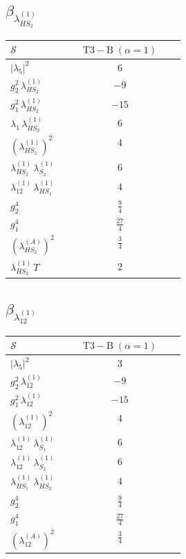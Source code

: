 \documentclass[9pt]{article}
\begin{document}
\subsection*{$ \beta_{\lambda_{HS_2}^{(1)}} $}
\begin{longtable}{@{}p{0.31\linewidth}c@{}}
\toprule
$\mathcal{S}$ & $ \mathrm{T3-B}\;(\alpha=1) $ \\
\midrule
$ |\lambda_5|^2 $ & $ 6 $ \\
$ g_2^2\,\lambda_{HS_2}^{(1)} $ & $ -9 $ \\
$ g_1^2\,\lambda_{HS_2}^{(1)} $ & $ -15 $ \\
$ \lambda_1\,\lambda_{HS_2}^{(1)} $ & $ 6 $ \\
$ \left(\lambda_{HS_2}^{(1)}\right)^2 $ & $ 4 $ \\
$ \lambda_{HS_2}^{(1)}\,\lambda_{S_2}^{(1)} $ & $ 6 $ \\
$ \lambda_{12}^{(1)}\,\lambda_{HS_1}^{(1)} $ & $ 4 $ \\
$ g_2^4 $ & $ \frac{9}{4} $ \\
$ g_1^4 $ & $ \frac{27}{4} $ \\
$ \left(\lambda_{HS_2}^{(A)}\right)^2 $ & $ \frac{3}{4} $ \\
$ \lambda_{HS_2}^{(1)}\,T $ & $ 2 $ \\
\bottomrule
\end{longtable}
\subsection*{$ \beta_{\lambda_{12}^{(1)}} $}
\begin{longtable}{@{}p{0.31\linewidth}c@{}}
\toprule
$\mathcal{S}$ & $ \mathrm{T3-B}\;(\alpha=1) $ \\
\midrule
$ |\lambda_5|^2 $ & $ 3 $ \\
$ g_2^2\,\lambda_{12}^{(1)} $ & $ -9 $ \\
$ g_1^2\,\lambda_{12}^{(1)} $ & $ -15 $ \\
$ \left(\lambda_{12}^{(1)}\right)^2 $ & $ 4 $ \\
$ \lambda_{12}^{(1)}\,\lambda_{S_1}^{(1)} $ & $ 6 $ \\
$ \lambda_{12}^{(1)}\,\lambda_{S_2}^{(1)} $ & $ 6 $ \\
$ \lambda_{HS_1}^{(1)}\,\lambda_{HS_2}^{(1)} $ & $ 4 $ \\
$ g_2^4 $ & $ \frac{9}{4} $ \\
$ g_1^4 $ & $ \frac{27}{4} $ \\
$ \left(\lambda_{12}^{(A)}\right)^2 $ & $ \frac{3}{4} $ \\
\bottomrule
\end{longtable}
\end{document}
